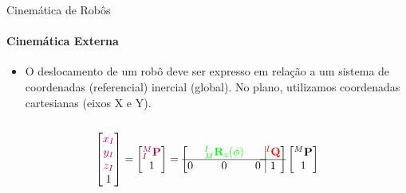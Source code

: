 \documentclass{beamer}
\begin{document}
\begin{frame}{Cinemática de Robôs}
    \framesubtitle{Cinemática Externa}
    \begin{itemize}
        \item O deslocamento de um robô deve ser expresso em relação a um sistema de
              coordenadas (referencial) inercial (global). No plano, utilizamos coordenadas
              cartesianas (eixos X e Y).
    \end{itemize}

    \begin{columns}
        \begin{column}[c]{0.5\textwidth}
            
        \end{column}
        \begin{column}[c]{0.5\textwidth}
            
        \end{column}
    \end{columns}

    \begin{equation*}
        \begin{bmatrix}
            \color{purple}{x_I} \\ \color{purple}{y_I} \\ \color{purple}{z_I}\\1
        \end{bmatrix}
        =
        \begin{bmatrix}
            \color{purple}{{}^M_I\mathbf{P}} \\ 1
        \end{bmatrix}
        =
        \left[
            \begin{matrix}
                  & \color{green}{{}_M^I\mathbf{R}_z(\phi)} &   \\ \hline
                0 & 0                                       & 0 \\
            \end{matrix} \right.
            \left.
            \vline
            \begin{matrix}
                \color{red}{{}^I\mathbf{Q}} \\ \hline
                1
            \end{matrix} \right]
        \begin{bmatrix}
            {}^M\mathbf{P} \\
            1
        \end{bmatrix}
    \end{equation*}

\end{frame}
\end{document}
